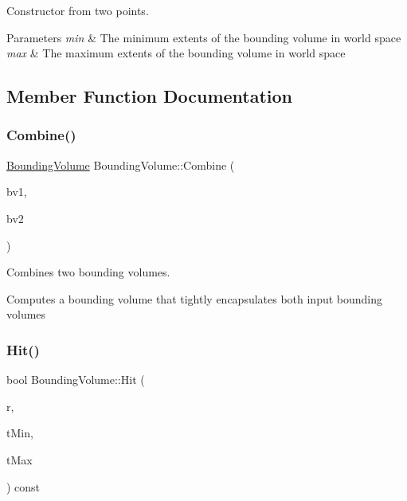 Constructor from two points. 


\begin{DoxyParams}{Parameters}
{\em min} & The minimum extents of the bounding volume in world space \\
\hline
{\em max} & The maximum extents of the bounding volume in world space \\
\hline
\end{DoxyParams}


\subsection{Member Function Documentation}
\mbox{\label{class_bounding_volume_afbe70324973e3ae457ed83d332e57581}} 
\subsubsection{\texorpdfstring{Combine()}{Combine()}}
{\footnotesize\ttfamily \mbox{\hyperlink{class_bounding_volume}{Bounding\+Volume}} Bounding\+Volume\+::\+Combine (\begin{DoxyParamCaption}\item[{const \mbox{\hyperlink{class_bounding_volume}{Bounding\+Volume}} \&}]{bv1,  }\item[{const \mbox{\hyperlink{class_bounding_volume}{Bounding\+Volume}} \&}]{bv2 }\end{DoxyParamCaption})\hspace{0.3cm}{\ttfamily [static]}}



Combines two bounding volumes. 

Computes a bounding volume that tightly encapsulates both input bounding volumes \mbox{\label{class_bounding_volume_a257cd7e43d376fe2cf19208046bfb248}} 
\subsubsection{\texorpdfstring{Hit()}{Hit()}}
{\footnotesize\ttfamily bool Bounding\+Volume\+::\+Hit (\begin{DoxyParamCaption}\item[{const \mbox{\hyperlink{class_ray}{Ray}} \&}]{r,  }\item[{float}]{t\+Min,  }\item[{float}]{t\+Max }\end{DoxyParamCaption}) const}



